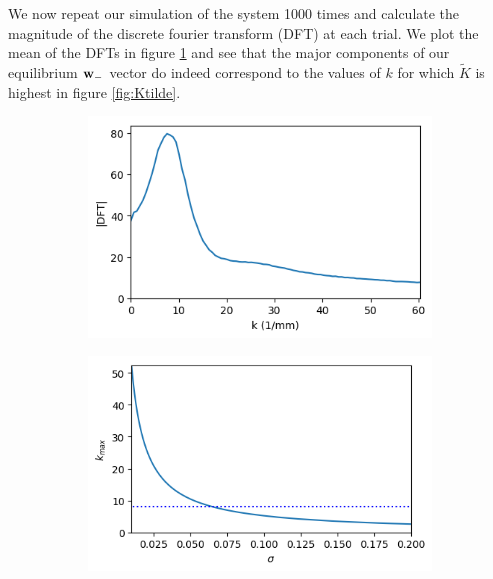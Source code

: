 \documentclass{article}
\begin{document}
We now repeat our simulation of the system 1000 times and calculate the magnitude of the discrete fourier transform (DFT) at each trial. We plot the mean of the DFTs in figure \ref{fig:DFT} and see that the major components of our equilibrium ${\bf w}_-$ vector do indeed correspond to the values of $k$ for which $\tilde K$ is highest in figure \ref{fig:Ktilde}. 

\begin{figure}[h]
	\centering
	\begin{subfigure}[t]{0.45\linewidth}
		\centering
		\includegraphics[width = 1.0\linewidth, trim={0 0 0 0}, clip=true]{figures/plot_DFT.png}
		\label{fig:DFT}	
	\end{subfigure}%
	\begin{subfigure}[t]{0.45\linewidth}
		\centering
		\includegraphics[width = 1.0\linewidth, trim={0 0 0 0}, clip=true]{figures/test_maxk.png}
		\label{fig:maxk}	
	\end{subfigure}%
\caption{}
\label{}
\end{figure}
\end{document}
